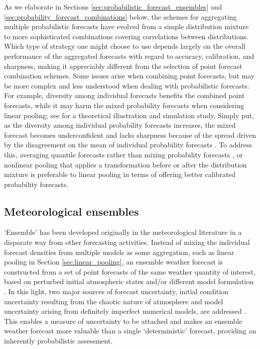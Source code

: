 \documentclass[11pt]{article}
\begin{document}
As we elaborate in Sections \ref{sec:probabilistic_forecast_ensembles} and \ref{sec:probability_forecast_combinations} below, the schemes for aggregating multiple probabilistic forecasts have evolved from a simple distribution mixture to more sophisticated combinations covering correlations between distributions. Which type of strategy one might choose to use depends largely on the overall performance of the aggregated forecasts with regard to accuracy, calibration, and sharpness, making it appreciably different from the selection of point forecast combination schemes. Some issues arise when combining point forecasts, but may be more complex and less understood when dealing with probabilistic forecasts. For example, diversity among individual forecasts benefits the combined point forecasts, while it may harm the mixed probability forecasts when considering linear pooling; see \cite{Ranjan2010-jl} for a theoretical illustration and simulation study. Simply put, as the diversity among individual probability forecasts increases, the mixed forecast becomes underconfident and lacks sharpness because of the spread driven by the disagreement on the mean of individual probability forecasts \citep{Hora2004-fz,Wallis2005-yf,Ranjan2010-jl}. To address this, averaging quantile forecasts rather than mixing probability forecasts \citep{Lichtendahl2013-rt}, or nonlinear pooling that applies a transformation before or after the distribution mixture \citep{Ranjan2010-jl,Gneiting2013-hl} is preferable to linear pooling in terms of offering better calibrated probability forecasts.

\subsection{Meteorological ensembles}
\label{sec:meteorological_ensembles}

`Ensemble' has been developed originally in the meteorological literature in a disparate way from other forecasting activities. Instead of mixing the individual forecast densities from multiple models as some aggregation, such as linear pooling in Section \ref{sec:linear_pooling}, an ensemble weather forecast is constructed from a set of point forecasts of the same weather quantity of interest, based on perturbed initial atmospheric states \citep[e.g.,][]{Maqsood2004-pe,Gneiting2005-yn} and/or different model formulation \citep[e.g.,][]{Buizza1999-st,Buizza2005-wf}. In this light, two major sources of forecast uncertainty, initial condition uncertainty resulting from the chaotic nature of atmosphere and model uncertainty arising from definitely imperfect numerical models, are addressed \citep{Lorenz1963-yn,Weigel2008-vy,Baran2014-tm}. This enables a measure of uncertainty to be attached and makes an ensemble weather forecast more valuable than a single `deterministic' forecast, providing an inherently probabilistic assessment.
\end{document}
